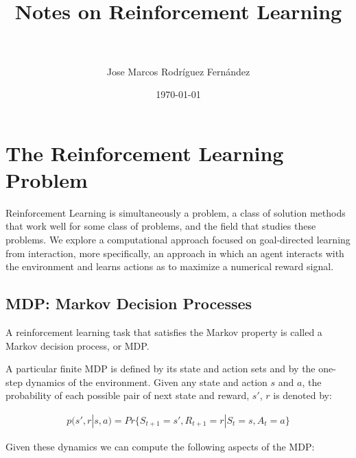 \documentclass[paper=a4,fontsize=11pt]{scrartcl} %
\title{	
    \normalfont \normalsize 
    \horrule{0.5pt} \\[0.4cm] %
    \huge Notes on Reinforcement Learning \\ %
    \horrule{2pt} \\[0.5cm] %
}
\author{Jose Marcos Rodr\'iguez Fern\'andez} %
\date{\normalsize\today} %
\numberwithin{equation}{section} %
\numberwithin{figure}{section} %
\numberwithin{table}{section} %
\begin{document}
\tableofcontents %
\maketitle %

\newpage
\section{The Reinforcement Learning Problem}

Reinforcement Learning is simultaneously a problem, a class of solution methods 
that work well for some class of problems, and the field that studies these problems.
We explore a computational approach focused on goal-directed learning from interaction, 
more specifically, an approach in which an agent interacts with the environment and learns
actions as to maximize a numerical reward signal.


\subsection{MDP: Markov Decision Processes}

A reinforcement learning task that satisfies the Markov property is called a
Markov decision process, or MDP.

A particular finite MDP is defined by its state and action sets and by the
one-step dynamics of the environment. Given any state and action $s$ and $a$,
the probability of each possible pair of next state and reward, $s'$, $r$ is denoted by:

\begin{align}
    p(s',r | s,a) = Pr\{ S_{t+1}=s', R_{t+1}=r | S_t=s, A_t=a  \}
\end{align}

Given these dynamics we can compute the following aspects of the MDP:
\end{document}
